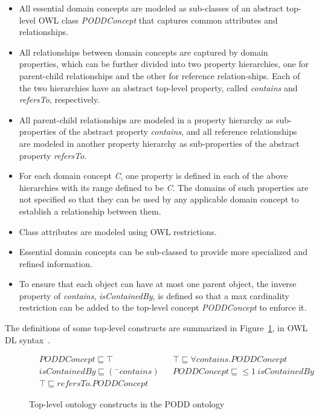 \documentclass{llncs}
\begin{document}
\begin{itemize}
\item All essential domain concepts are modeled as sub-classes of an
abstract top-level OWL class \emph{PODDConcept} that captures common
attributes and relationships.

\item All relationships between domain concepts are captured by domain
properties, which can be further divided into two property hierarchies,
one for parent-child relationships and the other for reference
relation-ships. Each of the two hierarchies have an abstract top-level
property, called \emph{contains} and \emph{refersTo}, respectively.

\item All parent-child relationships are modeled in a property hierarchy
as sub-properties of the abstract property \emph{contains}, and all
reference relationships are modeled in another property hierarchy as
sub-properties of the abstract property \emph{refersTo}.

\item For each domain concept \emph{C}, one property is defined in each of the
above hierarchies with its range defined to be \emph{C}. The domains of
such properties are not specified so that they can be used by any
applicable domain concept to establish a relationship between them.

\item Class attributes are modeled using OWL restrictions.

\item Essential domain concepts can be sub-classed to provide more
specialized and refined information.

\item To ensure that each object can have at most one parent object, the
inverse property of \emph{contains}, \emph{isContainedBy}, is defined
so that a max cardinality restriction can be added to the top-level
concept \emph{PODDConcept} to enforce it.
\end{itemize}

The definitions of some top-level constructs are summarized in
Figure~\ref{fig:top}, in OWL DL syntax~\cite{hoph03a}.

\vspace{-16pt}
{\small
\begin{figure}
\begin{align*}
& PODDConcept \sqsubseteq \top && \top \sqsubseteq \forall contains.PODDConcept\\
& isContainedBy \sqsubseteq (^- contains) && PODDConcept \sqsubseteq \leq 1~ isContainedBy\\
& \top \sqsubseteq refersTo.PODDConcept &&
\end{align*}

\vspace{-8pt}
\caption{Top-level ontology constructs in the PODD
ontology}\label{fig:top}
\end{figure}}
\end{document}
